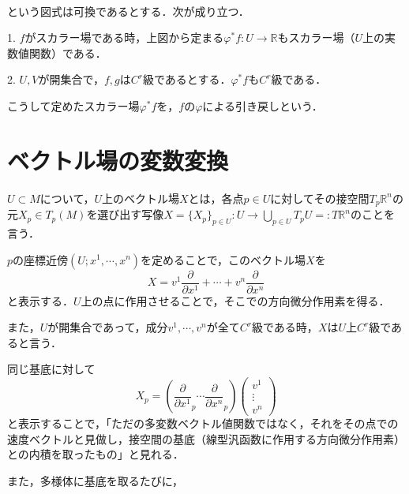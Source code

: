 \documentclass[uplatex, dvipdfmx]{jsreport}
\begin{document}
\begin{proposition}[pullback]　

    \begin{center}
    \end{center}
    という図式は可換であるとする．次が成り立つ．

    1. $f$がスカラー場である時，上図から定まる$\varphi^*f:U\to\mathbb{R}$もスカラー場（$U$上の実数値関数）である．

    2. $U,V$が開集合で，$f,g$は$C^r$級であるとする．$\varphi^*f$も$C^r$級である．

    こうして定めたスカラー場$\varphi^*f$を，$f$の$\varphi$による引き戻しという．
\end{proposition}

\section{ベクトル場の変数変換}

\begin{definition}[ベクトル場とその局所座標表示]
    $U\subset M$について，$U$上のベクトル場$X$とは，各点$p\in U$に対してその接空間$T_p\mathbb{R}^n$の元$X_p\in T_p(M)$を選び出す写像$X=\{X_p\}_{p\in U}:U\to \bigcup_{p\in U}T_pU=:T\mathbb{R}^n$のことを言う．
    
    $p$の座標近傍$(U;x^1, \cdots, x^n)$を定めることで，このベクトル場$X$を
    \[ X=v^1\frac{\partial}{\partial x^1}+\cdots +v^n\frac{\partial}{\partial x^n} \]
    と表示する．$U$上の点に作用させることで，そこでの方向微分作用素を得る．
    
    また，$U$が開集合であって，成分$v^1, \cdots, v^n$が全て$C^r$級である時，$X$は$U$上$C^r$級であると言う．
\end{definition}
\begin{remark}
    同じ基底に対して
    \[ X_p = \left( \frac{\partial}{\partial x^1}_p \cdots \frac{\partial}{\partial x^n}_p\right) \left(\begin{array}{c}v^1 \\ \vdots \\ v^n\end{array}\right)  \]
    と表示することで，「ただの多変数ベクトル値関数ではなく，それをその点での速度ベクトルと見做し，接空間の基底（線型汎函数に作用する方向微分作用素）との内積を取ったもの」と見れる．

    また，多様体に基底を取るたびに，
\end{remark}
\end{document}
